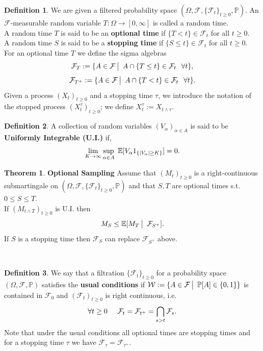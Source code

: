 \documentclass[12pt]{article}
\newcommand{\cF}{\mathcal{F}}
\newcommand{\E}{\mathbb{E}}
\newcommand{\Prb}{\mathbb{P}}
\newcommand{\quantifyspace}{\hspace{2px} \big | \hspace{5px}}
\newcommand{\cheekynewline}{$\text{ }$\\}
\newcommand{\PS}{(\Omega, \cF, \Prb)}
\newcommand{\cFPS}{(\Omega, \cF, \{ \cF_t\}_{t \geq 0}, \Prb)}
\newcommand{\cFi}{\{\cF_t\}_{t \geq 0}}
\newcommand{\spc}{\hspace{7 px}}
\newcommand{\sspc}{\hspace{3 px}}
\newcommand{\ind}[1]{1_{\{#1\}}}
\theoremstyle{definition}
\newtheorem{defn}{Definition}
\newtheorem{thm}{Theorem}
\begin{document}
\begin{defn}
    We are given a filtered probability space $\cFPS$. 
    An $\cF$-measurable random variable $T: \Omega \to [0,\infty]$ is called a random time. \\
    A random time $T$ is said to be an \textbf{optional time} if $\{T < t\} \in \cF_t$ for all $t \geq 0$.  \\
    A random time $S$ is said to be a \textbf{stopping time} if $\{S \leq t\} \in \cF_t$ for all $t \geq 0$.  \\
    For an optional time $T$ we define the sigma algebras
    \[
        \cF_T := \{A \in \cF \quantifyspace A \cap \{T \leq t\} \in \cF_t \spc \forall t \},
    \]
    \[
        \cF_{T^+} := \{A \in \cF \quantifyspace A \cap \{T < t\} \in \cF_t \spc \forall t \}.
    \]
    Given a process $(X_t)_{t \geq 0}$ and a stopping time $\tau$, we introduce the notation of the stopped process $(X^\tau_t)_{t \geq 0}$; we define $X^\tau_t := X_{t \wedge \tau}$.
\end{defn}

\begin{defn}
    A collection of random variables $(V_\alpha)_{\alpha \in A}$ is said to be \textbf{Uniformly Integrable (U.I.)} if,
    \[
        \lim_{K \to \infty} \sup_{\alpha \in A} \sspc \E [V_\alpha \ind{|V_\alpha| \geq K}] = 0.
    \]
\end{defn}

\begin{thm}
    \textbf{Optional Sampling} \cite{karatzas1991}
    Assume that $(M_t)_{t \geq 0}$ is a right-continuous submartingale on $\cFPS$ and that $S, T$ are optional times s.t. $0 \leq S \leq T$. \\
    If $(M_{t \wedge T})_{t \geq 0}$ is U.I. then
    \[
        M_S \leq \E[M_T \quantifyspace \cF_{S^+}].
    \]
    If $S$ is a stopping time then $\cF_S$ can replace $\cF_{S^+}$ above.
\end{thm}
\cheekynewline

\begin{defn}
    We say that a filtration $\cFi$ for a probability space $\PS$ satisfies the \textbf{usual conditions} if $\mathcal{W} := \{A \in \cF \quantifyspace \Prb[A] \in \{0,1\}\}$ is contained in $\cF_0$
    and $(\cF_t)_{t \geq 0}$ is right continuous, i.e.
    \[
        \forall t \geq 0 \spc \spc \cF_t = \cF_{t^+} = \bigcap_{s > t} \cF_s.
    \]
    Note that under the usual conditions all optional times are stopping times and for a stopping time $\tau$ we have $\cF_\tau = \cF_{\tau^+}$.
\end{defn}
\end{document}
